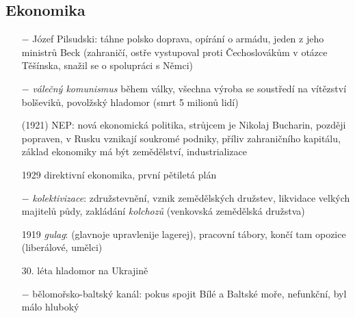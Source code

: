 \documentclass{article}
\begin{document}
\subsection*{Ekonomika}
\begin{itemize}
    \vspace{-0.5em}
    \setlength\itemsep{0.15em}
    \item[$-$] Józef Pilsudski: táhne polsko doprava, opírání o armádu, jeden z jeho ministrů Beck (zahraničí, ostře vystupoval proti Čechoslovákům v otázce Těšínska, snažil se o spolupráci s Němci)
    \item[$-$] \textit{válečný komunismus} během války, všechna výroba se soustředí na vítězství bolševiků, povolžský hladomor (smrt 5 milionů lidí)
    \item[(1921)] NEP: nová ekonomická politika, strůjcem je Nikolaj Bucharin, později popraven, v Rusku vznikají soukromé podniky, příliv zahraničního kapitálu, základ ekonomiky má být zemědělství, industrializace
    \item[1929] direktivní ekonomika, první pětiletá plán
    \item[$-$] \textit{kolektivizace}: združstevnění, vznik zemědělských družstev, likvidace velkých majitelů půdy, zakládání \textit{kolchozů} (venkovská zemědělská družstva)
    \item[1919] \textit{gulag}: (glavnoje upravlenije lagerej), pracovní tábory, končí tam opozice (liberálové, umělci)
    \item[30. léta] hladomor na Ukrajině
    \item[$-$] bělomořsko-baltský kanál: pokus spojit Bílé a Baltské moře, nefunkční, byl málo hluboký
\end{itemize}
\end{document}
